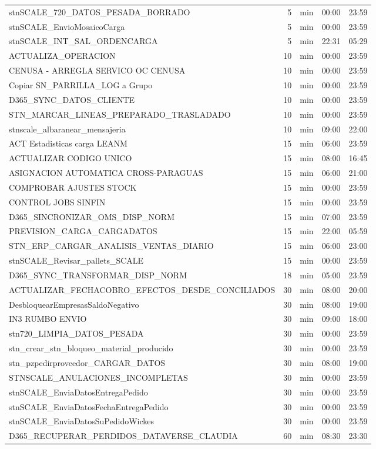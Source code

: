 \documentclass[11pt,a4paper]{article}
\begin{document}
\begin{longtable}{p{8.6cm}rp{1.3cm}p{1.6cm}p{1.6cm}}
stnSCALE\_720\_DATOS\_PESADA\_BORRADO & 5 & min & 00:00 & 23:59 \\
stnSCALE\_EnvioMosaicoCarga & 5 & min & 00:00 & 23:59 \\
stnSCALE\_INT\_SAL\_ORDENCARGA & 5 & min & 22:31 & 05:29 \\
ACTUALIZA\_OPERACION & 10 & min & 00:00 & 23:59 \\
CENUSA - ARREGLA SERVICO OC CENUSA & 10 & min & 00:00 & 23:59 \\
Copiar SN\_PARRILLA\_LOG a Grupo & 10 & min & 00:00 & 23:59 \\
D365\_SYNC\_DATOS\_CLIENTE & 10 & min & 00:00 & 23:59 \\
STN\_MARCAR\_LINEAS\_PREPARADO\_TRASLADADO & 10 & min & 00:00 & 23:59 \\
stnscale\_albaranear\_mensajeria & 10 & min & 09:00 & 22:00 \\
ACT Estadisticas carga LEANM & 15 & min & 06:00 & 23:59 \\
ACTUALIZAR CODIGO UNICO & 15 & min & 08:00 & 16:45 \\
ASIGNACION AUTOMATICA CROSS-PARAGUAS & 15 & min & 06:00 & 21:00 \\
COMPROBAR AJUSTES STOCK & 15 & min & 00:00 & 23:59 \\
CONTROL JOBS SINFIN & 15 & min & 00:00 & 23:59 \\
D365\_SINCRONIZAR\_OMS\_DISP\_NORM & 15 & min & 07:00 & 23:59 \\
PREVISION\_CARGA\_CARGADATOS & 15 & min & 22:00 & 05:59 \\
STN\_ERP\_CARGAR\_ANALISIS\_VENTAS\_DIARIO & 15 & min & 06:00 & 23:00 \\
stnSCALE\_Revisar\_pallets\_SCALE & 15 & min & 00:00 & 23:59 \\
D365\_SYNC\_TRANSFORMAR\_DISP\_NORM & 18 & min & 05:00 & 23:59 \\
ACTUALIZAR\_FECHACOBRO\_EFECTOS\_DESDE\_CONCILIADOS & 30 & min & 08:00 & 20:00 \\
DesbloquearEmpresasSaldoNegativo & 30 & min & 08:00 & 19:00 \\
IN3 RUMBO ENVIO & 30 & min & 09:00 & 18:00 \\
stn720\_LIMPIA\_DATOS\_PESADA & 30 & min & 00:00 & 23:59 \\
stn\_crear\_stn\_bloqueo\_material\_producido & 30 & min & 00:00 & 23:59 \\
stn\_pzpedirproveedor\_CARGAR\_DATOS & 30 & min & 08:00 & 19:00 \\
STNSCALE\_ANULACIONES\_INCOMPLETAS & 30 & min & 00:00 & 23:59 \\
stnSCALE\_EnviaDatosEntregaPedido & 30 & min & 00:00 & 23:59 \\
stnSCALE\_EnviaDatosFechaEntregaPedido & 30 & min & 00:00 & 23:59 \\
stnSCALE\_EnviaDatosSuPedidoWickes & 30 & min & 00:00 & 23:59 \\
D365\_RECUPERAR\_PERDIDOS\_DATAVERSE\_CLAUDIA & 60 & min & 08:30 & 23:30 \\
\bottomrule
\end{longtable}
\end{document}
